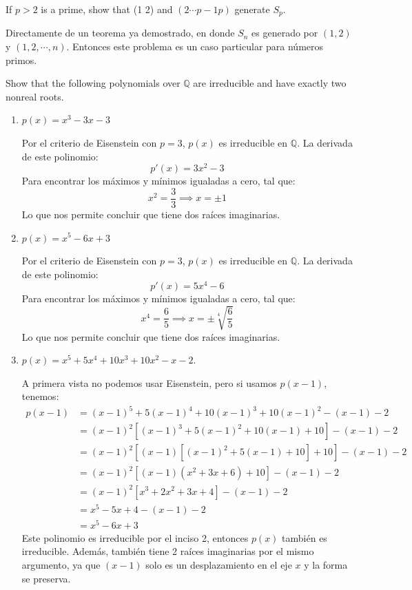 \begin{problema}[Problema 3]
    If $p>2$ is a prime, show that (1 2) and $(2 \cdots p-1 p)$ generate $S_p$.
    \begin{dem}
        Directamente de un teorema ya demostrado, en donde $S_n$ es generado por $(1,2)$ y $(1,2,\cdots,n)$. Entonces este problema es un caso particular para números primos. 
    \end{dem}
\end{problema}




\begin{problema}[Problema 5]
    Show that the following polynomials over $\mathbb{Q}$ are irreducible and have exactly two nonreal roots.
    \begin{enumerate}
        \item $p(x)=x^3-3 x-3$
        \begin{sol}
            Por el criterio de Eisenstein con $p=3$, $p(x)$ es irreducible en $\mathbb{Q}$. La derivada de este polinomio: 
            $$p'(x)=3x^2-3$$
            Para encontrar los máximos y mínimos igualadas a cero, tal que:
            $$x^2=\frac{3}{3}\implies x=\pm 1$$
            Lo que nos permite concluir que tiene dos raíces imaginarias.
        \end{sol}
        \item $p(x)=x^5-6 x+3$
        \begin{sol}
            Por el criterio de Eisenstein con $p=3$, $p(x)$ es irreducible en $\mathbb{Q}$. La derivada de este polinomio: 
            $$p'(x)=5x^4-6$$
            Para encontrar los máximos y mínimos igualadas a cero, tal que:
            $$x^4=\frac{6}{5}\implies x=\pm \sqrt[4]{\frac{6}{5}}$$
            Lo que nos permite concluir que tiene dos raíces imaginarias.
        \end{sol}
        \item $p(x)=x^5+5 x^4+10 x^3+10 x^2-x-2$.
        \begin{sol}
            A primera vista no podemos usar Eisenstein, pero si usamos $p(x-1)$, tenemos: 
            \begin{align*}
                p(x-1) &= (x-1)^5+5(x-1)^4+10 (x-1)^3+10 (x-1)^2-(x-1)-2\\
                       &= (x-1)^2[(x-1)^3+5(x-1)^2+10(x-1)+10]-(x-1)-2\\
                       &= (x-1)^2[(x-1)[(x-1)^2+5(x-1)+10]+10]-(x-1)-2\\
                       &= (x-1)^2[(x-1)(x^2+3x+6)+10]-(x-1)-2\\
                       &= (x-1)^2[x^3+2x^2+3x+4]-(x-1)-2\\
                       &= x^5-5x+4-(x-1)-2\\
                       &= x^5-6x+3
            \end{align*}
            Este polinomio es irreducible por el inciso 2, entonces $p(x)$ también es irreducible. Además, también tiene 2 raíces imaginarias por el mismo argumento, ya que $(x-1)$ solo es un desplazamiento en el eje $x$ y la forma se preserva. 
        \end{sol}
    \end{enumerate}


\end{problema}
